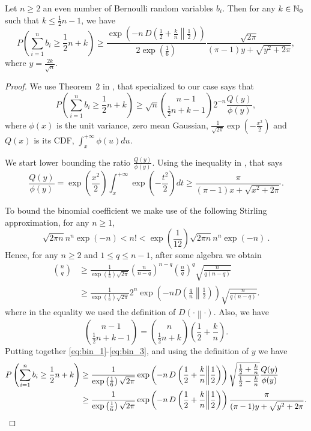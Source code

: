 \begin{theorem}
\label{lemma:bin}
Let $n\geq2$ an even number of Bernoulli random variables $b_i$. Then for any $k \in \mathbb{N}_0$ such that $k\leq \frac{1}{2}n-1$, we have
\[
P\left( \sum_{i=1}^n b_i \geq \frac{1}{2} n + k\right) 
\geq  \frac{\exp\left(-n\, D\left(\frac{1}{2}+\frac{k}{n}\middle\|\frac{1}{2}\right)\right)}{2 \exp\left(\frac{1}{6}\right)} \frac{\sqrt{2 \pi}}{(\pi-1)y+\sqrt{y^2+2 \pi}},
\]
where $y=\frac{2 k}{\sqrt{n}}$.
\end{theorem}
\begin{proof}
We use Theorem~2 in \cite{McKay1989}, that specialized to our case says that
\begin{equation}
\label{eq:bin_1}
P\left( \sum_{i=1}^n b_i \geq  \frac{1}{2} n + k  \right) 
\geq \sqrt{n} \binom{n-1}{ \frac{1}{2} n + k -1} 2^{-n} \frac{Q(y)}{\phi(y)},
\end{equation}
where $\phi(x)$ is the unit variance, zero mean Gaussian, $\frac{1}{\sqrt{2 \pi}} \exp(-\frac{x^2}{2})$ and $Q(x)$ is its CDF, $\int_{x}^{+\infty} \phi(u) du$.

We start lower bounding the ratio $\frac{Q(y)}{\phi(y)}$. Using the inequality in \cite{Boyd59}, that says
\[
\frac{Q(y)}{\phi(y)} 
= \exp\left(\frac{x^2}{2}\right) \int_{x}^{+\infty} \exp\left(-\frac{t^2}{2}\right) dt
\geq \frac{\pi}{(\pi-1)x+\sqrt{x^2+2 \pi}}.
\]

To bound the binomial coefficient we make use of the following Stirling approximation, for any $n\geq 1$,
\[
\sqrt{2 \pi n} n^n \exp(-n) < n! < \exp\left(\frac{1}{12}\right)\sqrt{2 \pi n} n^n \exp(-n)~.
\]
Hence, for any $n \geq 2$ and $1\leq q \leq n-1$, after some algebra we obtain
\begin{align*}
{n \choose q} 
&\geq \frac{1}{\exp\left(\frac{1}{6}\right) \sqrt{2 \pi}} \left(\frac{n}{n-q}\right)^{n-q} \left(\frac{n}{q}\right)^{q} \sqrt{\frac{n}{q(n-q)}} \\
&\geq \frac{1}{\exp\left(\frac{1}{6}\right) \sqrt{2 \pi}} 2^n \exp\left(-n D\left(\frac{q}{n}\middle\|\frac{1}{2}\right)\right) \sqrt{\frac{n}{q(n-q)}}.
\end{align*}
where in the equality we used the definition of $D\left(\cdot\middle\|\cdot\right)$.
Also, we have
\begin{equation}
\label{eq:bin_3}
{n-1 \choose \frac{1}{2} n + k - 1} = {n \choose \frac{1}{2} n + k} \left(\frac{1}{2} + \frac{k}{n}\right) .
\end{equation}
Putting together \eqref{eq:bin_1}-\eqref{eq:bin_3}, and using the definition of $y$ we have
\begin{align*}
P\left( \sum_{i=1}^n b_i \geq \frac{1}{2} n + k \right) 
&\geq \frac{1}{\exp\left(\frac{1}{6}\right) \sqrt{2 \pi}} \exp\left(-n\, D\left(\frac{1}{2}+\frac{k}{n}\middle\|\frac{1}{2}\right)\right) \sqrt{\frac{\frac{1}{2} + \frac{k}{n}}{\frac{1}{2}-\frac{k}{n}}}  \frac{Q(y)}{\phi(y)} \\
&\geq \frac{1}{\exp\left(\frac{1}{6}\right) \sqrt{2 \pi}} \exp\left(-n\, D\left(\frac{1}{2}+\frac{k}{n}\middle\|\frac{1}{2}\right)\right) \frac{\pi}{(\pi-1)y+\sqrt{y^2+2 \pi}}. \qedhere
\end{align*}
\end{proof}

